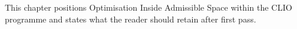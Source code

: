This chapter positions Optimisation Inside Admissible Space within the CLIO programme and states what the reader should retain after first pass.
